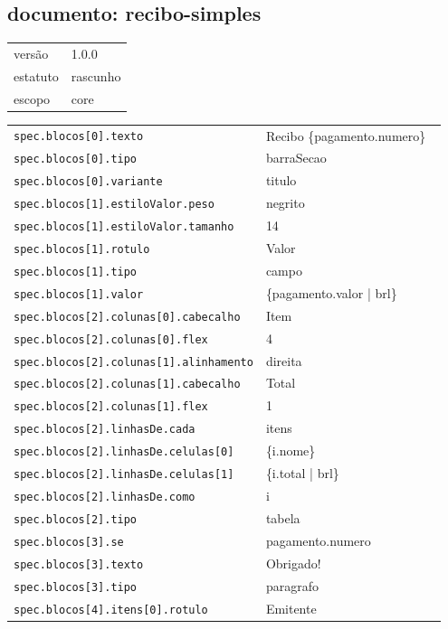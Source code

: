 \subsection*{documento: recibo-simples}
\begin{tabular}{@{}ll@{}}
versão & 1.0.0 \\
estatuto & rascunho \\
escopo & core \\
\end{tabular}

\begin{tabular}{@{}p{0.35\linewidth}p{0.6\linewidth}@{}}
\texttt{spec.blocos[0].texto} & Recibo \{pagamento.numero\} \\
\texttt{spec.blocos[0].tipo} & barraSecao \\
\texttt{spec.blocos[0].variante} & titulo \\
\texttt{spec.blocos[1].estiloValor.peso} & negrito \\
\texttt{spec.blocos[1].estiloValor.tamanho} & 14 \\
\texttt{spec.blocos[1].rotulo} & Valor \\
\texttt{spec.blocos[1].tipo} & campo \\
\texttt{spec.blocos[1].valor} & \{pagamento.valor | brl\} \\
\texttt{spec.blocos[2].colunas[0].cabecalho} & Item \\
\texttt{spec.blocos[2].colunas[0].flex} & 4 \\
\texttt{spec.blocos[2].colunas[1].alinhamento} & direita \\
\texttt{spec.blocos[2].colunas[1].cabecalho} & Total \\
\texttt{spec.blocos[2].colunas[1].flex} & 1 \\
\texttt{spec.blocos[2].linhasDe.cada} & itens \\
\texttt{spec.blocos[2].linhasDe.celulas[0]} & \{i.nome\} \\
\texttt{spec.blocos[2].linhasDe.celulas[1]} & \{i.total | brl\} \\
\texttt{spec.blocos[2].linhasDe.como} & i \\
\texttt{spec.blocos[2].tipo} & tabela \\
\texttt{spec.blocos[3].se} & pagamento.numero \\
\texttt{spec.blocos[3].texto} & Obrigado! \\
\texttt{spec.blocos[3].tipo} & paragrafo \\
\texttt{spec.blocos[4].itens[0].rotulo} & Emitente \\

\end{tabular}
